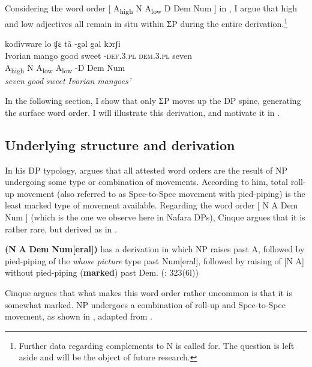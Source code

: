 \documentclass[output=paper]{langscibook}
\begin{document}
Considering the word order [ A\textsubscript{high}  N  A\textsubscript{low}  D  Dem  Num ] in , I argue that high and low adjectives all remain in situ within ƩP during the entire derivation.\footnote{Further data regarding complements to N is called for. The question is left aside and will be the object of future research.}  


\ea\label{ex:baron:14}
\glll kodivware lo ʧɛ tã -gəl gal kɔrʃi\\
   Ivorian mango good sweet  -\textsc{def.3.pl} \textsc{dem.3.pl} seven\\
   A\textsubscript{high}   N  A\textsubscript{low}  A\textsubscript{low}  -D  Dem  Num\\
 \textit{seven} \textit{good} \textit{sweet} \textit{Ivorian} \textit{mangoes’}
\z

In the following section, I show that only ƩP moves up the DP spine, generating the surface word order. I will illustrate this derivation, and motivate it in .

 
\subsection{Underlying structure and derivation} 
\label{sec:baron:2.2}
In his DP typology, \citet{Cinque2005} argues that all attested word orders are the result of NP undergoing some type or combination of movements. According to him, total roll-up movement (also referred to as Spec-to-Spec movement with pied-piping) is the least marked type of movement available. Regarding the word order [ N A Dem Num ] (which is the one we observe here in Nafara DPs), Cinque argues that it is rather rare, but derived as in .

\ea\label{ex:baron:15}
\textbf{(N} \textbf{A} \textbf{Dem} \textbf{Num[eral])} has a derivation in which NP raises past A, followed by pied-piping of the \textit{whose} \textit{picture} type past Num[eral], followed by raising of [N A] without  pied-piping (\textbf{marked}) past Dem.        (\citealt{Cinque2005}: 323(6l))
\z

Cinque argues that what makes this word order rather uncommon is that it is somewhat marked. NP undergoes a combination of roll-up and Spec-to-Spec movement, as shown in , adapted from \citet{Cinque2005}.
\end{document}

